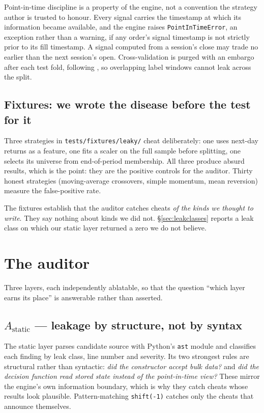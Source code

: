 \documentclass[11pt,a4paper]{article}
\begin{document}
Point-in-time discipline is a property of the engine, not a convention the strategy author is
trusted to honour. Every signal carries the timestamp at which its information became available,
and the engine raises \texttt{PointInTimeError}, an exception rather than a warning, if any order's
signal timestamp is not strictly prior to its fill timestamp. A signal computed from a session's
close may trade no earlier than the next session's open. Cross-validation is purged with an
embargo after each test fold, following \citet{lopezdeprado2018}, so overlapping label windows
cannot leak across the split.

\subsection{Fixtures: we wrote the disease before the test for it}

Three strategies in \texttt{tests/fixtures/leaky/} cheat deliberately: one uses next-day
returns as a feature, one fits a scaler on the full sample before splitting, one selects its
universe from end-of-period membership. All three produce absurd results, which is the point:
they are the positive controls for the auditor. Thirty honest strategies (moving-average
crossovers, simple momentum, mean reversion) measure the false-positive rate.

\begin{scopebox}
The fixtures establish that the auditor catches cheats \emph{of the kinds we thought to write}.
They say nothing about kinds we did not. \S\ref{sec:leakclasses} reports a leak class on which
our static layer returned a zero we do not believe.
\end{scopebox}

\section{The auditor}
\label{sec:auditor}

Three layers, each independently ablatable, so that the question ``which layer earns its place''
is answerable rather than asserted.

\subsection{$A_{\mathrm{static}}$ --- leakage by structure, not by syntax}

The static layer parses candidate source with Python's \texttt{ast} module and classifies each
finding by leak class, line number and severity. Its two strongest rules are structural rather
than syntactic: \emph{did the constructor accept bulk data?} and \emph{did the decision function
read stored state instead of the point-in-time view?} These mirror the engine's own information
boundary, which is why they catch cheats whose results look plausible. Pattern-matching
\texttt{shift(-1)} catches only the cheats that announce themselves.
\end{document}
